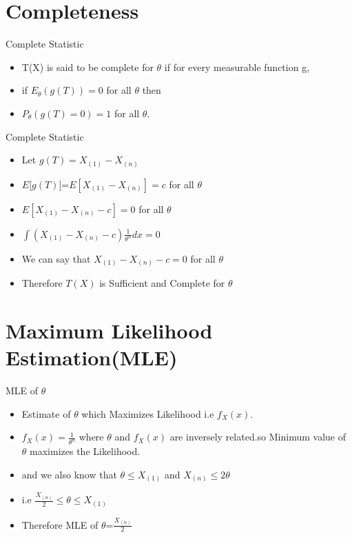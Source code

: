 \documentclass[aspectratio=169,xcolor=dvipsnames]{beamer}
\begin{document}
\section{Completeness}

\begin{frame}{Complete Statistic}
  \begin{itemize}
      \item T(X) is said to be complete for $\theta$ if for every measurable function g,
      \item if ${E_\theta}(g(T))=0 $ for all $\theta$ then
      \item $ P_\theta(g(T)=0)=1 $ for all $\theta$.
  \end{itemize}
\end{frame}

\begin{frame}{Complete Statistic}
  \begin{itemize}
      \item Let $g(T)=X_{(1)}-X_{(n)}$
      \item $E[g(T)$]=$E[X_{(1)}-X_{(n)}]=c$ for all $\theta$
      \item $E[X_{(1)}-X_{(n)}-c]=0$ for all $\theta$
      \item $\int (X_{(1)}-X_{(n)}-c)\frac{1}{\theta^n}dx=0$
      \item We can say that $X_{(1)}-X_{(n)}-c=0$ for all $\theta$
      \item Therefore $T(X)$ is Sufficient and Complete for   $\theta$ 
  \end{itemize}
\end{frame}

\section{Maximum Likelihood Estimation(MLE)}

\begin{frame}{MLE of $\theta$}
  \begin{itemize}
      \item Estimate of $\theta$ which Maximizes Likelihood i.e $f_X(x)$.
      \item $f_X(x)=\frac{1}{\theta^n}$ where $\theta$ and $f_X(x)$ are inversely related.so Minimum value of $\theta$ maximizes the Likelihood.
      \item and we also know that $\theta\leq X_{(1)}$ and $X_{(n)}\leq2\theta$
      \item i.e $\frac{X_{(n)}}{2}\leq \theta \leq X_{(1)}$
      \item Therefore MLE of $\theta$=$\frac{X_{(n)}}{2}$
      
  \end{itemize}
\end{frame}
\end{document}
